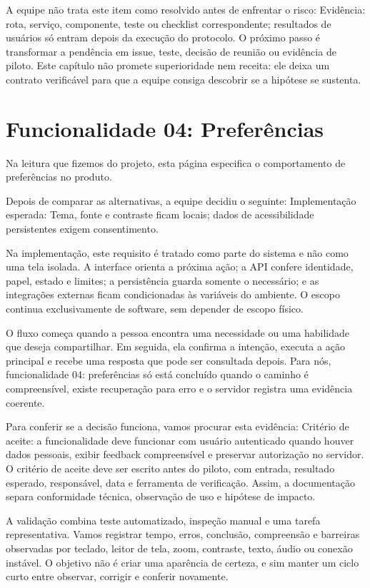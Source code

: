 \documentclass[12pt,oneside,a4paper,article]{abntex2}
\begin{document}
A equipe não trata este item como resolvido antes de enfrentar o risco: Evidência: rota, serviço, componente, teste ou checklist correspondente; resultados de usuários só entram depois da execução do protocolo. O próximo passo é transformar a pendência em issue, teste, decisão de reunião ou evidência de piloto. Este capítulo não promete superioridade nem receita: ele deixa um contrato verificável para que a equipe consiga descobrir se a hipótese se sustenta.

\section{Funcionalidade 04: Preferências}
Na leitura que fizemos do projeto, esta página especifica o comportamento de preferências no produto.

Depois de comparar as alternativas, a equipe decidiu o seguinte: Implementação esperada: Tema, fonte e contraste ficam locais; dados de acessibilidade persistentes exigem consentimento.

Na implementação, este requisito é tratado como parte do sistema e não como uma tela isolada. A interface orienta a próxima ação; a API confere identidade, papel, estado e limites; a persistência guarda somente o necessário; e as integrações externas ficam condicionadas às variáveis do ambiente. O escopo continua exclusivamente de software, sem depender de escopo físico.

O fluxo começa quando a pessoa encontra uma necessidade ou uma habilidade que deseja compartilhar. Em seguida, ela confirma a intenção, executa a ação principal e recebe uma resposta que pode ser consultada depois. Para nós, funcionalidade 04: preferências só está concluído quando o caminho é compreensível, existe recuperação para erro e o servidor registra uma evidência coerente.

Para conferir se a decisão funciona, vamos procurar esta evidência: Critério de aceite: a funcionalidade deve funcionar com usuário autenticado quando houver dados pessoais, exibir feedback compreensível e preservar autorização no servidor. O critério de aceite deve ser escrito antes do piloto, com entrada, resultado esperado, responsável, data e ferramenta de verificação. Assim, a documentação separa conformidade técnica, observação de uso e hipótese de impacto.

A validação combina teste automatizado, inspeção manual e uma tarefa representativa. Vamos registrar tempo, erros, conclusão, compreensão e barreiras observadas por teclado, leitor de tela, zoom, contraste, texto, áudio ou conexão instável. O objetivo não é criar uma aparência de certeza, e sim manter um ciclo curto entre observar, corrigir e conferir novamente.
\end{document}
